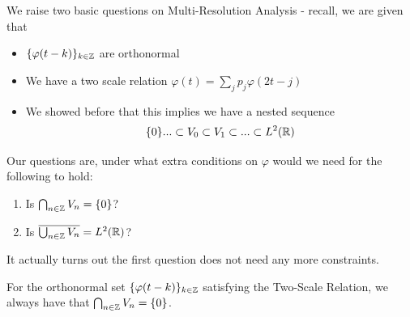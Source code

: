 \documentclass{article}
\begin{document}
{We raise two basic questions on Multi-Resolution Analysis - recall, we are given that
\begin{itemize}
    \item $\{\varphi(t - k)\}_{k \in \mathbb{Z}}$ are orthonormal
    \item We have a two scale relation $\varphi(t) = \sum_j p_j \varphi(2t - j)$
    \item We showed before that this implies we have a nested sequence
    \[\{0\} ... \subset V_0 \subset V_1 \subset ... \subset L^2(\mathbb{R})\]
\end{itemize}
Our questions are, under what extra conditions on $\varphi$ would we need for the following to hold:
\begin{enumerate}
    \item Is $\bigcap_{n \in \mathbb{Z}} V_n = \{0\}$?
    \item Is $\overline{\bigcup_{n \in \mathbb{Z}} V_n} = L^2(\mathbb{R})$?
\end{enumerate}

It actually turns out the first question does not need any more constraints.

\begin{proposition}
    For the orthonormal set $\{\varphi(t - k)\}_{k \in \mathbb{Z}}$ satisfying the Two-Scale Relation, we always have that $\bigcap_{n \in \mathbb{Z}} V_n = \{0\}$.
\end{proposition}

}
\end{document}

